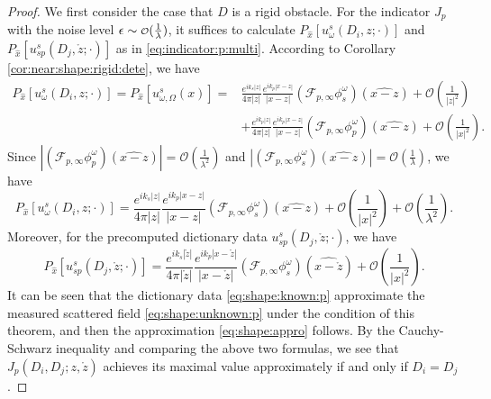 \documentclass[a4paper,11pt]{article}
\newcommand{\mO}{\mathcal{O}}
\newcommand\smallO{
  \mathchoice
    {{\scriptstyle\mathcal{O}}}%
    {{\scriptstyle\mathcal{O}}}%
    {{\scriptscriptstyle\mathcal{O}}}%
    {\scalebox{.7}{$\scriptscriptstyle\mathcal{O}$}}%
  }
\theoremstyle{remark}
\theoremstyle{definition}
\numberwithin{equation}{section}
\begin{document}
\begin{proof}
We first consider the case that $D$ is a rigid obstacle. For the indicator $J_{p}$ with the noise level $\epsilon \sim  \smallO (\frac{1}{\lambda})$, it suffices to calculate $P_{\hat{x}}[u_{\omega}^s(D_i,z;\cdot)]$ and  $P_{\hat{x}}[u_{sp}^s(D_j,\mathring{z};\cdot)]$ as in \eqref{eq:indicator:p:multi}. According to Corollary \ref{cor:near:shape:rigid:dete}, we have
\begin{align*}
P_{\hat{x}}[u_{\omega}^s(D_i,z;\cdot)] = P_{\hat{x}} [u_{\omega,\Omega}^s(x)] =& \frac{e^{ik_s|z|}}{4 \pi |z|}  \frac{e^{ik_p|x-z|}}{|x-z|}
(\mathcal{F}_{p,\infty}\phi_{s}^\omega)(\widehat{x-z}) + \mO(\frac{1}{|z|^2})  \\
 &   +\frac{e^{ik_p|z|}}{4 \pi |z|}   \frac{e^{ik_p|x-z|}}{|x-z|} (\mathcal{F}_{p,\infty}\phi_{p}^\omega)(\widehat{x-z}) + \mathcal{O}(\frac{1}{|x|^2}).
\end{align*}
Since $|(\mathcal{F}_{p,\infty}\phi_{p}^\omega)(\widehat{x-z})| = \mO(\frac{1}{\lambda^2})$ and $|(\mathcal{F}_{p,\infty}\phi_{s}^\omega)(\widehat{x-z})| = \mO(\frac{1}{\lambda})$, we have
\begin{equation}\label{eq:shape:unknown:p}
P_{\hat{x}}[u_{\omega}^s(D_i,z;\cdot)] = \frac{e^{ik_s|z|}}{4 \pi |z|}   \frac{e^{ik_p|x-z|}}{|x-z|} (\mathcal{F}_{p,\infty}\phi_{s}^\omega)(\widehat{x-z}) + \mathcal{O}(\frac{1}{|x|^2}) + \mO(\frac{1}{\lambda^2}).
\end{equation}
Moreover, for the precomputed dictionary data $u_{sp}^s(D_j,\mathring{z};\cdot)$, we have
\begin{equation}\label{eq:shape:known:p}
P_{\hat{x}}[u_{sp}^s(D_j,\mathring{z};\cdot)] = \frac{e^{ik_s|\mathring{z}|}}{4 \pi |\mathring{z}|}   \frac{e^{ik_p|x-\mathring{z}|}}{|x-\mathring{z}|} (\mathcal{F}_{p,\infty}\phi_{s}^\omega)(\widehat{x-\mathring{z}}) + \mathcal{O}(\frac{1}{|x|^2}).
\end{equation}
It can be seen that the dictionary data \eqref{eq:shape:known:p} approximate the measured scattered field \eqref{eq:shape:unknown:p} under the condition of this theorem, and then the approximation \eqref{eq:shape:appro} follows.
By the Cauchy-Schwarz inequality and comparing the above two formulas, we see that $J_{p}(D_i,D_j;z, \mathring{z})$ achieves its maximal value approximately if and only if $D_i = D_j$.


\end{proof}
\end{document}
